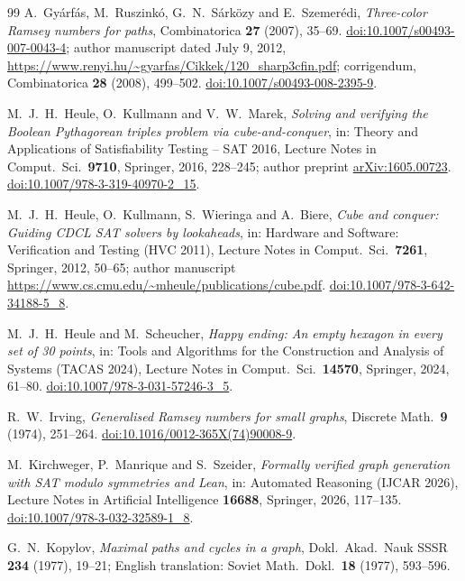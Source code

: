 \documentclass[11pt]{article}
\theoremstyle{definition}
\theoremstyle{remark}
\begin{document}
\begin{thebibliography}{99}
A.~Gyárfás, M.~Ruszinkó, G.~N.~Sárközy and E.~Szemerédi,
\emph{Three-color Ramsey numbers for paths}, Combinatorica \textbf{27}
(2007), 35--69.
\href{https://doi.org/10.1007/s00493-007-0043-4}{doi:10.1007/s00493-007-0043-4};
author manuscript dated July 9, 2012,
\url{https://www.renyi.hu/~gyarfas/Cikkek/120_sharp3cfin.pdf};
corrigendum, Combinatorica \textbf{28} (2008), 499--502.
\href{https://doi.org/10.1007/s00493-008-2395-9}{doi:10.1007/s00493-008-2395-9}.

M.~J.~H.~Heule, O.~Kullmann and V.~W.~Marek, \emph{Solving and verifying
the Boolean Pythagorean triples problem via cube-and-conquer}, in: Theory
and Applications of Satisfiability Testing -- SAT 2016, Lecture Notes in
Comput.\ Sci.\ \textbf{9710}, Springer, 2016, 228--245;
author preprint \href{https://arxiv.org/abs/1605.00723}{arXiv:1605.00723}.
\href{https://doi.org/10.1007/978-3-319-40970-2_15}{doi:10.1007/978-3-319-40970-2\_15}.

M.~J.~H.~Heule, O.~Kullmann, S.~Wieringa and A.~Biere, \emph{Cube and
conquer: Guiding CDCL SAT solvers by lookaheads}, in: Hardware and
Software: Verification and Testing (HVC 2011), Lecture Notes in Comput.\
Sci.\ \textbf{7261}, Springer, 2012, 50--65;
author manuscript \url{https://www.cs.cmu.edu/~mheule/publications/cube.pdf}.
\href{https://doi.org/10.1007/978-3-642-34188-5_8}{doi:10.1007/978-3-642-34188-5\_8}.

M.~J.~H.~Heule and M.~Scheucher, \emph{Happy ending: An empty hexagon in
every set of 30 points}, in: Tools and Algorithms for the Construction and
Analysis of Systems (TACAS 2024), Lecture Notes in Comput.\ Sci.\
\textbf{14570}, Springer, 2024, 61--80.
\href{https://doi.org/10.1007/978-3-031-57246-3_5}{doi:10.1007/978-3-031-57246-3\_5}.

\bibitem{Irv74}
R.~W.~Irving, \emph{Generalised Ramsey numbers for small graphs},
Discrete Math.\ \textbf{9} (1974), 251--264.
\href{https://doi.org/10.1016/0012-365X(74)90008-9}{doi:10.1016/0012-365X(74)90008-9}.

\bibitem{KMS26}
M.~Kirchweger, P.~Manrique and S.~Szeider,
\emph{Formally verified graph generation with SAT modulo symmetries and Lean},
in: Automated Reasoning (IJCAR 2026), Lecture Notes in Artificial Intelligence
\textbf{16688}, Springer, 2026, 117--135.
\href{https://doi.org/10.1007/978-3-032-32589-1_8}{doi:10.1007/978-3-032-32589-1\_8}.

\bibitem{Kop77}
G.~N.~Kopylov, \emph{Maximal paths and cycles in a graph}, Dokl.\ Akad.\
Nauk SSSR \textbf{234} (1977), 19--21; English translation: Soviet Math.\
Dokl.\ \textbf{18} (1977), 593--596.


\end{thebibliography}
\end{document}
